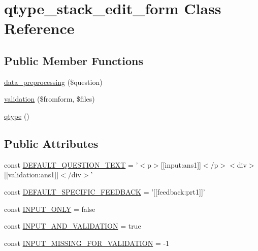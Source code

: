 \hypertarget{classqtype__stack__edit__form}{
\section{qtype\_\-stack\_\-edit\_\-form Class Reference}
\label{classqtype__stack__edit__form}
}
\subsection*{Public Member Functions}
\begin{DoxyCompactItemize}
\item 
\hyperlink{classqtype__stack__edit__form_a3a6f3817b03966c85e356ac8ca5cf282}{data\_\-preprocessing} (\$question)
\item 
\hyperlink{classqtype__stack__edit__form_aefcc5794da54566c77717d20fd8f8dce}{validation} (\$fromform, \$files)
\item 
\hyperlink{classqtype__stack__edit__form_a1c7f53813d4245cc61b5d41a526dd2ba}{qtype} ()
\end{DoxyCompactItemize}
\subsection*{Public Attributes}
\begin{DoxyCompactItemize}
\item 
const \hyperlink{classqtype__stack__edit__form_a4727a6b48985a79263c0a88619682593}{DEFAULT\_\-QUESTION\_\-TEXT} = '$<$p$>$\mbox{[}\mbox{[}input:ans1\mbox{]}\mbox{]}$<$/p$>$$<$div$>$\mbox{[}\mbox{[}validation:ans1\mbox{]}\mbox{]}$<$/div$>$'
\item 
const \hyperlink{classqtype__stack__edit__form_a5858ef26f537b7e427e241402ee1f272}{DEFAULT\_\-SPECIFIC\_\-FEEDBACK} = '\mbox{[}\mbox{[}feedback:prt1\mbox{]}\mbox{]}'
\item 
const \hyperlink{classqtype__stack__edit__form_ad1239476262959653827524c32eb91ae}{INPUT\_\-ONLY} = false
\item 
const \hyperlink{classqtype__stack__edit__form_a248e954e20f1b632d6add869e196ec3d}{INPUT\_\-AND\_\-VALIDATION} = true
\item 
const \hyperlink{classqtype__stack__edit__form_a9eb08a24f442c2c37019fbc69f6120ee}{INPUT\_\-MISSING\_\-FOR\_\-VALIDATION} = -\/1
\end{DoxyCompactItemize}
